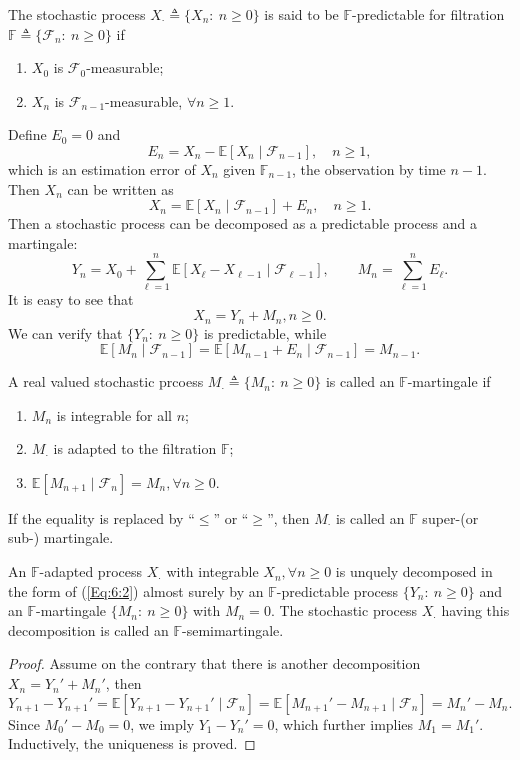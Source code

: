 \begin{definition}[Predictable]
The stochastic process $X_{\cdot}\triangleq\{X_n:~n\ge0\}$ is said to be $\mathbb{F}$-predictable
for filtration $\mathbb{F}\triangleq\{\mathcal{F}_n:~n\ge0\}$ if 
\begin{enumerate}
\item
$X_0$ is $\mathcal{F}_0$-measurable;
\item
$X_n$ is $\mathcal{F}_{n-1}$-measurable, $\forall n\ge1$.
\end{enumerate}
\end{definition}
Define $E_0=0$ and 
\[
E_n = X_n - \mathbb{E}[X_n\mid \mathcal{F}_{n-1}],\quad n\ge1,
\]
which is an estimation error of $X_n$ given $\mathbb{F}_{n-1}$, the observation by time $n-1$.
Then $X_n$ can be written as
\[
X_n = \mathbb{E}[X_n\mid \mathcal{F}_{n-1}] + E_n,\quad n\ge1.
\]
Then a stochastic process can be decomposed as a predictable process and a martingale:
\[
Y_n = X_0 + \sum_{\ell=1}^n\mathbb{E}[X_\ell-X_{\ell-1}\mid \mathcal{F}_{\ell-1}],\qquad
M_n=\sum_{\ell=1}^nE_{\ell}.
\]
It is easy to see that 
\begin{equation}\label{Eq:6:2}
X_n = Y_n + M_n, n\ge0.
\end{equation}
We can verify that $\{Y_n:~n\ge0\}$ is predictable, while
\[
\mathbb{E}[M_n\mid\mathcal{F}_{n-1}] = \mathbb{E}[M_{n-1}+E_n\mid\mathcal{F}_{n-1}]=M_{n-1}.
\]

\begin{definition}[Martingale]
A real valued stochastic prcoess $M_{\cdot}\triangleq \{M_n:~n\ge0\}$ is called an $\mathbb{F}$-martingale if
\begin{enumerate}
\item
$M_n$ is integrable for all $n$;
\item
$M_{\cdot}$ is adapted to the filtration $\mathbb{F}$;
\item
$\mathbb{E}[M_{n+1}\mid\mathcal{F}_{n}]=M_n,\forall n\ge0$.
\end{enumerate}
If the equality is replaced by ``$\le$'' or ``$\ge$'', then $M_{\cdot}$ is called an $\mathbb{F}$ super-(or sub-) martingale.
\end{definition}

\begin{theorem}
An $\mathbb{F}$-adapted process $X_{\cdot}$ with integrable $X_n,\forall n\ge0$ is unquely decomposed in the form of (\ref{Eq:6:2}) almost surely by
an $\mathbb{F}$-predictable process $\{Y_n:~n\ge0\}$ and an  $\mathbb{F}$-martingale $\{M_n:~n\ge0\}$ with $M_n=0$.
The stochastic process $X_{\cdot}$ having this decomposition is called an $\mathbb{F}$-semimartingale.
\end{theorem}
\begin{proof}
Assume on the contrary that there is another decomposition $X_n=Y_n'+M_n'$, then
\[
Y_{n+1}-Y_{n+1}' = \mathbb{E}[Y_{n+1}-Y_{n+1}'\mid\mathcal{F}_n]
=\mathbb{E}[M_{n+1}'-M_{n+1}\mid\mathcal{F}_n]=M_n'-M_n.
\]
Since $M_0'-M_0=0$, we imply $Y_1-Y_n'=0$, which further implies $M_1=M_1'$.
Inductively, the uniqueness is proved.

\end{proof}

